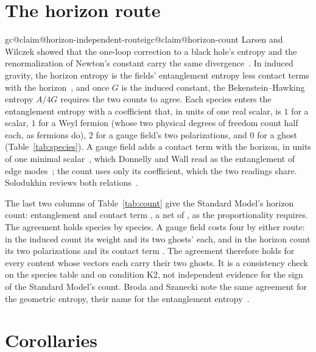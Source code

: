 \documentclass[aps,prd,reprint,amsmath,amssymb,superscriptaddress,nofootinbib]{revtex4-2}
\makeatletter
\newcommand{\claim}[1]{\expandafter\xdef\csname igc@claim@#1\endcsname{\thesection}}
\makeatother
\begin{document}
\section{The horizon route}
\label{sec:horizon}

\claim{horizon-independent-route}\claim{horizon-count}%
Larsen and Wilczek showed that the one-loop correction to a black hole's entropy and
the renormalization of Newton's constant carry the same
divergence~\cite{LarsenWilczek1996}. In induced gravity, the horizon entropy is the
fields' entanglement entropy less contact terms with the
horizon~\cite{FrolovFursaevZelnikov1997}, and once $G$ is the induced constant, the
Bekenstein--Hawking entropy $A/4G$ requires the two counts to agree. Each species
enters the entanglement entropy with a coefficient that, in units of one real scalar,
is $1$ for a scalar, $1$ for a Weyl fermion (whose two physical degrees of freedom
count half each, as fermions do), $2$ for a gauge field's two polarizations, and $0$
for a ghost (Table~\ref{tab:species}). A gauge field adds a contact term with the
horizon, \contactPerGaugeField{} in units of one minimal scalar~\cite{Kabat1995},
which Donnelly and Wall read as the entanglement of edge
modes~\cite{DonnellyWall2015}; the count uses only its coefficient, which the two
readings share. Solodukhin reviews both relations~\cite{Solodukhin2011}.

The last two columns of Table~\ref{tab:count} give the Standard Model's horizon count:
entanglement \smEntanglement{} and contact term \smContact{}, a net of \smNet{}, as
the proportionality requires. The agreement holds species by species. A gauge field
costs four by either route: in the induced count its weight \weightVector{} and its two
ghosts' \weightGhost{} each, and in the horizon count its two polarizations and its
contact term \contactPerGaugeField. The agreement therefore holds for every content
whose vectors each carry their two ghosts. It is a
consistency check on the species table and on condition K2, not independent evidence
for the sign of the Standard Model's count. Broda and Szanecki note the same
agreement for the geometric entropy, their name for the entanglement
entropy~\cite{BrodaSzanecki2009}.

\section{Corollaries}
\label{sec:corollaries}
\end{document}
